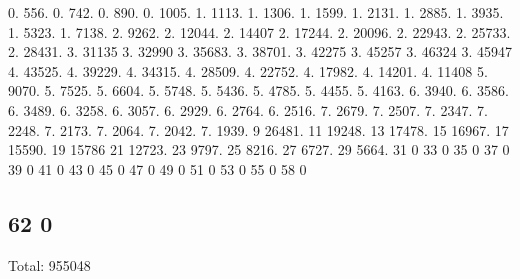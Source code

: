 0. 556. 0. 742. 0. 890. 0. 1005. 1. 1113. 1. 1306. 1. 1599. 1. 2131. 1. 2885. 1. 3935. 1. 5323. 1. 7138. 2. 9262. 2. 12044. 2. 14407 2. 17244. 2. 20096. 2. 22943. 2. 25733. 2. 28431. 3. 31135 3. 32990 3. 35683. 3. 38701. 3. 42275 3. 45257 3. 46324 3. 45947 4. 43525. 4. 39229. 4. 34315. 4. 28509. 4. 22752. 4. 17982. 4. 14201. 4. 11408 5. 9070. 5. 7525. 5. 6604. 5. 5748. 5. 5436. 5. 4785. 5. 4455. 5. 4163. 6. 3940. 6. 3586. 6. 3489. 6. 3258. 6. 3057. 6. 2929. 6. 2764. 6. 2516. 7. 2679. 7. 2507. 7. 2347. 7. 2248. 7. 2173. 7. 2064. 7. 2042. 7. 1939. 9 26481. 11 19248. 13 17478. 15 16967. 17 15590. 19 15786 21 12723. 23 9797. 25 8216. 27 6727. 29 5664. 31 0 33 0 35 0 37 0 39 0 41 0 43 0 45 0 47 0 49 0 51 0 53 0 55 0 58 0 \subsection*{62 0 }

Total\+: 955048 